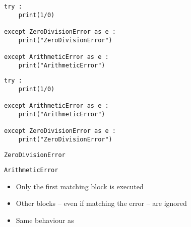 \begin{frame}[fragile]
%
\begin{tcbraster}[raster columns=2,
                  raster equal height,
                  nobeforeafter,
                  raster column skip=0.5cm]
\begin{codebox}
\begin{verbatim}
try :
    print(1/0)
    
except ZeroDivisionError as e :
    print("ZeroDivisionError")
    
except ArithmeticError as e :
    print("ArithmeticError")
\end{verbatim}
\end{codebox}
%
\begin{codebox}
\begin{verbatim}
try :
    print(1/0)
    
except ArithmeticError as e :
    print("ArithmeticError")
    
except ZeroDivisionError as e :
    print("ZeroDivisionError")
\end{verbatim}
\end{codebox}
\end{tcbraster}
%
\begin{tcbraster}[raster columns=2,
                  raster equal height,
                  nobeforeafter,
                  raster column skip=0.5cm]
\begin{cmdbox}
\begin{verbatim}
ZeroDivisionError
\end{verbatim}
\end{cmdbox}
%
\begin{cmdbox}
\begin{verbatim}
ArithmeticError
\end{verbatim}
\end{cmdbox}
\end{tcbraster}
%
\begin{itemize}
\item[\Thus] Only the first matching block is executed
\item[\Thus] Other  blocks -- even if matching the error -- are ignored
\item[\Thus] Same behaviour as 
\end{itemize}
%
\end{frame}

